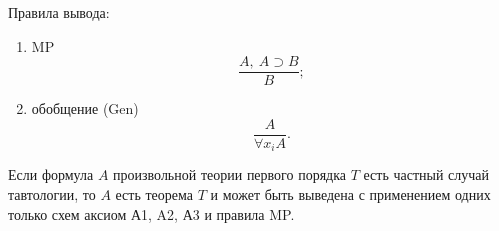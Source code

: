 Правила вывода:
\begin{enumerate}[label=\arabic*)]
    \item MP
    \[
        \frac{A,\ A \supset B}{B};
    \]
    \item обобщение (Gen)
    \[
        \frac{A}{\forall x_iA}.
    \]
\end{enumerate}

\begin{lemma}\label{th:tautology_is_theorem}
    Если формула $A$ произвольной теории первого порядка $T$ есть частный случай тавтологии, то $A$ есть теорема $T$ и может быть выведена с применением одних только схем аксиом А1, A2, А3 и правила MP.
\end{lemma}
